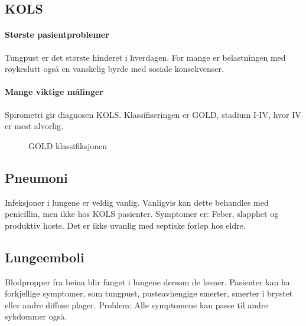 			\subsection{KOLS}
				\paragraph{Største pasientproblemer\\}
					Tungpust er det største hinderet i hverdagen. For mange er belastningen med røykeslutt også en vanskelig byrde med sosiale konsekvenser. 
				\paragraph{Mange viktige målinger\\}
					Spirometri gir diagnosen KOLS. Klassifiseringen er GOLD, stadium I-IV, hvor IV er mest alvorlig.
						\begin{figure}[ht]
                      \centering
                      \caption{GOLD klassifiksjonen}
                    \end{figure}
			\subsection{Pneumoni}
				Infeksjoner i lungene er veldig vanlig. Vanligvis kan dette behandles med penicillin, men ikke hos KOLS pasienter. Symptomer er: Feber, slapphet og produktiv hoste. Det er ikke uvanlig med septiske forløp hos eldre. 
			\subsection{Lungeemboli}
				Blodpropper fra beina blir fanget i lungene dersom de løsner. Pasienter kan ha forkjellige symptomer, som tungpust, pusteavhengige smerter, smerter i brystet eller andre diffuse plager. Problem: Alle symptomene kan passe til andre sykdommer også.
